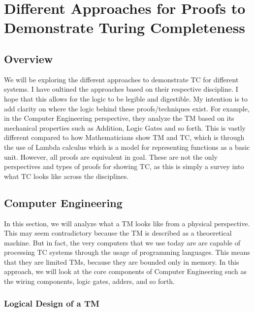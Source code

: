 \chapter{Different Approaches for Proofs to Demonstrate Turing Completeness}

\section{Overview}

We will be exploring the different approaches to demonstrate TC for different systems.
I have oultined the approaches based on their respective discipline.
I hope that this allows for the logic to be legible and digestible.
My intention is to add clarity on where the logic behind these proofs/techniques exist.
For example, in the Computer Engineering perspective, they analyze the TM based on its mechanical properties such as Addition, Logic Gates and so forth.
This is vastly different compared to how Mathematicians show TM and TC, which is through the use of Lambda calculus which is a model for representing functions as a basic unit.
However, all proofs are equivalent in goal.
These are not the only perspectives and types of proofs for showing TC, as this is simply a survey into what TC looks like across the disciplines.

\section{Computer Engineering}

In this section, we will analyze what a TM looks like from a physical perspective.
This may seem contradictory because the TM is described as a theoeretical machine.
But in fact, the very computers that we use today are are capable of processing TC systems through the usage of programming languages.
This means that they are limited TMs, because they are bounded only in memory.
In this approach, we will look at the core components of Computer Engineering such as the wiring components, logic gates, adders, and so forth.

\subsection{Logical Design of a TM}

